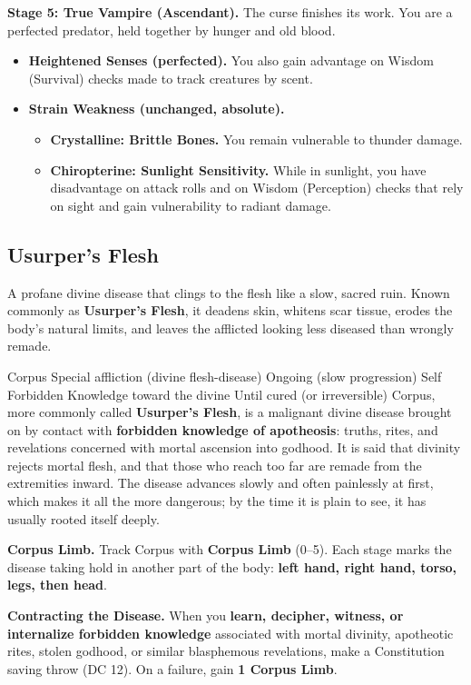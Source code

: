 \documentclass[letterpaper,twocolumn,openany,nodeprecatedcode,breakable,skins,xparse,most]{dndbook}
\begin{document}
\textbf{Stage 5: True Vampire (Ascendant).}
The curse finishes its work. You are a perfected predator, held together by hunger and old blood.
\begin{itemize}
\item \textbf{Heightened Senses (perfected).} You also gain advantage on Wisdom (Survival) checks made to track creatures by scent.
\item \textbf{Strain Weakness (unchanged, absolute).}
\begin{itemize}
\item \textbf{Crystalline: Brittle Bones.} You remain vulnerable to thunder damage.
\item \textbf{Chiropterine: Sunlight Sensitivity.} While in sunlight, you have disadvantage on attack rolls and on Wisdom (Perception) checks that rely on sight and gain vulnerability to radiant damage.
\end{itemize}
\end{itemize}

\subsection{Usurper's Flesh}

A profane divine disease that clings to the flesh like a slow, sacred ruin. Known commonly as \textbf{Usurper's Flesh}, it deadens skin, whitens scar tissue, erodes the body's natural limits, and leaves the afflicted looking less diseased than wrongly remade.

\DndSpellHeader%
  {Corpus}
  {Special affliction (divine flesh-disease)}
  {Ongoing (slow progression)}
  {Self}
  {Forbidden Knowledge toward the divine}
  {Until cured (or irreversible)}
Corpus, more commonly called \textbf{Usurper's Flesh}, is a malignant divine disease brought on by contact with \textbf{forbidden knowledge of apotheosis}: truths, rites, and revelations concerned with mortal ascension into godhood. It is said that divinity rejects mortal flesh, and that those who reach too far are remade from the extremities inward. The disease advances slowly and often painlessly at first, which makes it all the more dangerous; by the time it is plain to see, it has usually rooted itself deeply.

\textbf{Corpus Limb.} Track Corpus with \textbf{Corpus Limb} (0--5). Each stage marks the disease taking hold in another part of the body: \textbf{left hand, right hand, torso, legs, then head}.

\textbf{Contracting the Disease.} When you \textbf{learn, decipher, witness, or internalize forbidden knowledge} associated with mortal divinity, apotheotic rites, stolen godhood, or similar blasphemous revelations, make a Constitution saving throw (DC 12). On a failure, gain \textbf{1 Corpus Limb}.
\end{document}
